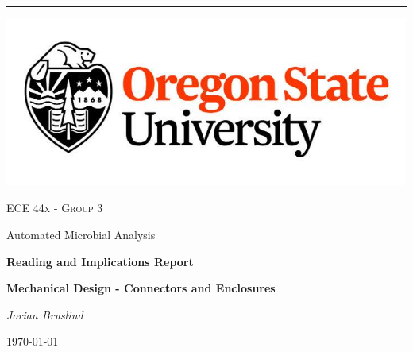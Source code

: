 \documentclass[11pt]{article}
\date{\today}
\begin{document}
\begin{titlepage}
	\centering
    \begin{minipage}{0.05\textwidth}


    \end{minipage}
    \rule[-400pt]{1.5pt}{600pt}
    \hspace*{0.05\textwidth} %
    \begin{minipage}{0.5\textwidth}
        \includegraphics[width=\textwidth]{osu.jpg}\par\vspace{1cm}
        \vspace{.5cm}
    	{\scshape\Large ECE 44x - Group 3  \par Automated Microbial Analysis\par}
    	\vspace{1cm}
    	{\huge\bfseries Reading and Implications Report \par}
    	{\large\bfseries Mechanical Design - Connectors and Enclosures \par}
    	\vspace{1cm}
    	{\Large\itshape Jorian Bruslind\par}

	    \vspace{1cm}
    \vspace{.25cm}
    \end{minipage}


	{\large \today\par}
\end{titlepage}
\tableofcontents

\newpage


\pagestyle{fancy}
\fancyhf{}

\begin{abstract}
    The purpose of this document is to provide context for the reader behind the design choices made within the perview of the mechanical design aspect of the Automated Microbial Analysis capstone project. This project aims to manipulate, analyze, and physically sort microbial samples present on 3M Petrifilm. This document will cover the mechanical concepts present in the system, the design choices for each concept and the proposed solution for each choice. Finally, this document will then cover the expected challenges with this project and possible solutions to said challenges. 
\end{abstract}
\end{document}
